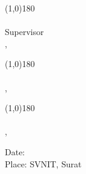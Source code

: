 \begin{multicols}{2}
    \begin{center}
        \line(1,0){180}\\
        {\SupervisorName} \\ 
        {Supervisor} \\ 
        {\SupervisorDept, \SUni}
    \end{center}
    
    \columnbreak

    \begin{center}
    \end{center}

\end{multicols}

\vspace{75pt}

\begin{multicols}{2}
    \begin{center}
        \line(1,0){180}\\
        {\ExaminerOneName} \\
        {\StudentDept, \Uni}
    \end{center}
    
    \columnbreak
    
    \begin{center}
        \line(1,0){180}\\
        {\ExaminerTwoName} \\
        {\StudentDept, \Uni}
    \end{center}

\end{multicols}

\vspace{15pt}

\begin{multicols}{2}
    {Date:} \\ 
    {Place: SVNIT, Surat}
    
    \columnbreak

    \begin{center}
    \end{center}

\end{multicols}